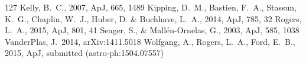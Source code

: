 \documentclass[apjl]{emulateapj}
\begin{document}
\begin{thebibliography}{99}
127
 Kelly, B.~C., 2007,
ApJ, 665, 1489
Kipping, D.~M., Bastien, F.~A., Stassun, K.~G., Chaplin, W.~J., Huber, D. \&
Buchhave, L.~A., 2014, ApJ, 785, 32
Rogers, L.~A., 2015, ApJ, 801, 41
Seager, S., \& Mall\'{e}n-Ornelas, G., 2003, ApJ, 585, 1038
VanderPlas, J.\ 2014, arXiv:1411.5018
Wolfgang, A., Rogers, L.~A., Ford, E.~B., 2015, ApJ, submitted
(astro-ph:1504.07557)
\end{thebibliography}
\end{document}
